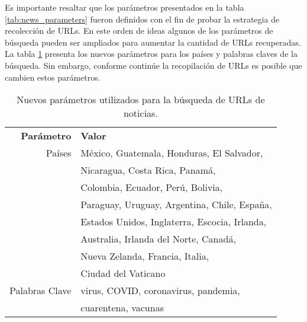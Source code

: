 Es importante resaltar que los parámetros presentados en la tabla \ref{tab:news_parameters} fueron definidos con el fin de probar la estrategia de recolección de URLs. En este orden de ideas algunos de los parámetros de búsqueda pueden ser ampliados para aumentar la cantidad de URLs recuperadas. La tabla \ref{tab:news_final_parameters} presenta los nuevos parámetros para los países y palabras claves de la búsqueda. Sin embargo, conforme continúe la recopilación de URLs es posible que cambien estos parámetros.

\begin{table}[h]
    \centering
    \begin{tabular}{r|l}
        \textbf{Parámetro} & \textbf{Valor} \\
        Países  & México, Guatemala, Honduras, El Salvador, \\
                & Nicaragua, Costa Rica, Panamá, \\
                & Colombia, Ecuador, Perú, Bolivia, \\
                & Paraguay, Uruguay, Argentina, Chile, España, \\
                & Estados Unidos, Inglaterra, Escocia, Irlanda, \\
                & Australia, Irlanda del Norte, Canadá, \\
                & Nueva Zelanda, Francia, Italia, \\
                & Ciudad del Vaticano \\
        Palabras Clave & virus, COVID, coronavirus, pandemia, \\
                & cuarentena, vacunas \\
    \end{tabular}
    \caption{Nuevos parámetros utilizados para la búsqueda de URLs de noticias.}
    \label{tab:news_final_parameters}
\end{table}


